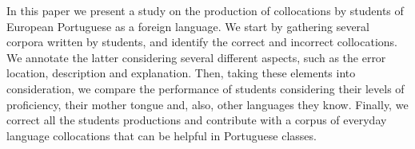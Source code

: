 In this paper we present a study on the production of collocations by students of European Portuguese as a foreign language. We start by gathering several corpora written by students, and identify the correct and incorrect collocations. We annotate the latter considering several different aspects, such as the error location, description and explanation. Then, taking these elements into consideration, we compare the performance of students considering their levels of proficiency, their mother tongue and, also, other languages they know. Finally, we correct all the students productions and contribute with a corpus of everyday language collocations that can be helpful in Portuguese classes.
